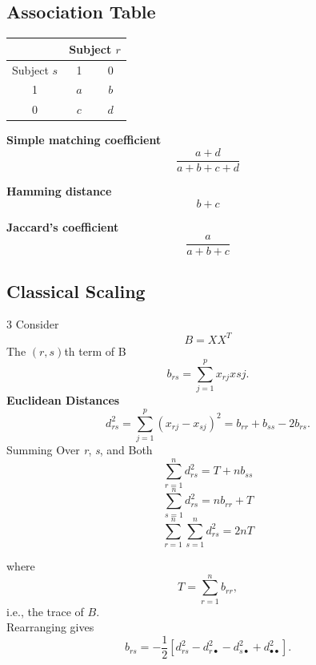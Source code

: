 \documentclass[a4paper,9pt,fleqn]{extarticle}
\begin{document}
\subsection*{Association Table}
\begin{minipage}[t]{0.22\textwidth}
\begin{tabular}{c|cc}
    \multicolumn{1}{c|}{} & \multicolumn{2}{c}{Subject $r$} \\
    \hline
    Subject $s$ & 1 & 0 \\
    \hline
    1 & $a$ & $b$ \\
    0 & $c$ & $d$ \\
\end{tabular}
\end{minipage}
\hfill
\begin{minipage}[t]{0.22\textwidth}
    \textbf{Simple matching coefficient}
    \[
    \frac{a + d}{a + b + c + d}
    \]
\end{minipage}
\hfill
\begin{minipage}[t]{0.22\textwidth}
    \textbf{Hamming distance}
    \[
    b + c
    \]
\end{minipage}
\hfill
\begin{minipage}[t]{0.22\textwidth}
    \textbf{Jaccard’s coefficient}
    \[
    \frac{a}{a + b + c}
    \]
\end{minipage}
\subsection*{Classical Scaling}
\begin{multicols}{3}
    Consider 
\[
B = XX^T
\]
The \((r, s)\)th term of B
\[
b_{rs} = \sum_{j=1}^{p}x_{rj}x{sj}.
\]
\textbf{Euclidean Distances}
\[
d_{rs}^2 = \sum_{j=1}^{p} (x_{rj} - x_{sj})^2 = b_{rr} + b_{ss} - 2b_{rs}.
\]
Summing Over \textit{r}, \textit{s}, and Both
\[
\sum_{r=1}^{n} d_{rs}^2 = T + n b_{ss}
\]
\[
\sum_{s=1}^{n} d_{rs}^2 = n b_{rr} + T
\]
\[
\sum_{r=1}^{n} \sum_{s=1}^{n} d_{rs}^2 = 2nT
\]

\noindent where
\[
T = \sum_{r=1}^{n} b_{rr},
\]
i.e., the trace of \( B \). \\
Rearranging gives
\[
b_{rs} = -\frac{1}{2} \left[ d_{rs}^2 - d_{r\bullet}^2 - d_{s\bullet}^2 + d_{\bullet\bullet}^2 \right].
\]
\end{multicols}
\end{document}
